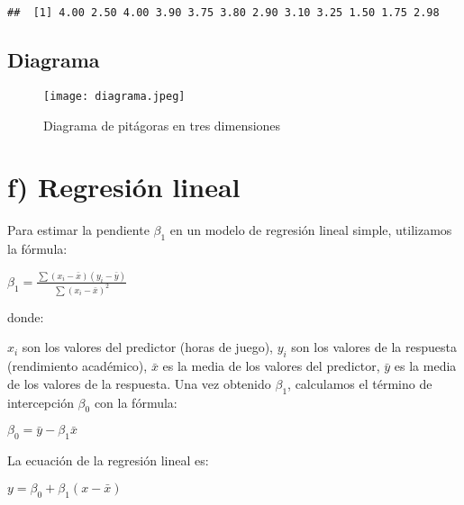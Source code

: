 \documentclass[
]{article}
\begin{document}
\begin{verbatim}
##  [1] 4.00 2.50 4.00 3.90 3.75 3.80 2.90 3.10 3.25 1.50 1.75 2.98
\end{verbatim}

\hypertarget{diagrama}{%
\subsection{Diagrama}\label{diagrama}}

\begin{figure}
\centering
\texttt{[image: diagrama.jpeg]}
\caption{Diagrama de pitágoras en tres dimensiones}
\end{figure}

\hypertarget{f-regresiuxf3n-lineal}{%
\section{f) Regresión lineal}\label{f-regresiuxf3n-lineal}}

Para estimar la pendiente \(\beta_1\) en un modelo de regresión lineal
simple, utilizamos la fórmula:

\(\beta_1 = \frac{\sum{(x_i - \bar{x})(y_i - \bar{y})}}{\sum{(x_i - \bar{x})^2}}\)

donde:

\(x_i\) son los valores del predictor (horas de juego), \(y_i\) son los
valores de la respuesta (rendimiento académico), \(\bar{x}\) es la media
de los valores del predictor, \(\bar{y}\) es la media de los valores de
la respuesta. Una vez obtenido \(\beta_1\), calculamos el término de
intercepción \(\beta_0\) con la fórmula:

\(\beta_0 = \bar{y} - \beta_1\bar{x}\)

La ecuación de la regresión lineal es:

\(y = \beta_0 + \beta_1(x - \bar{x})\)
\end{document}

